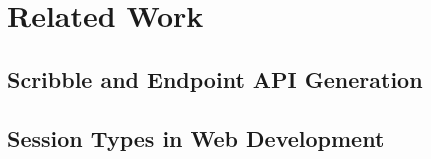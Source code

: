 \section{Related Work}
\label{section:bgrelated}

\subsection{Scribble and Endpoint API Generation}
\label{subsection:bgscribble}

\subsection{Session Types in Web Development}
\label{subsection:sessiontypewebdev}